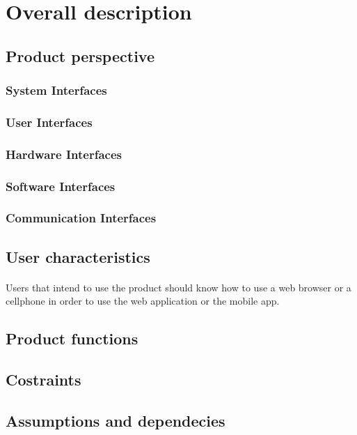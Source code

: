 \section{Overall description}
	\subsection{Product perspective}
		\subsubsection{System Interfaces}
		\subsubsection{User Interfaces}
		\subsubsection{Hardware Interfaces}
		\subsubsection{Software Interfaces}
		\subsubsection{Communication Interfaces}
	\subsection{User characteristics}
	\paragraph*{}Users that intend to use the product should know how to use a web browser or a cellphone in order to use the web application or the mobile app.
	\subsection{Product functions}
	\subsection{Costraints}
	\subsection{Assumptions and dependecies}
	